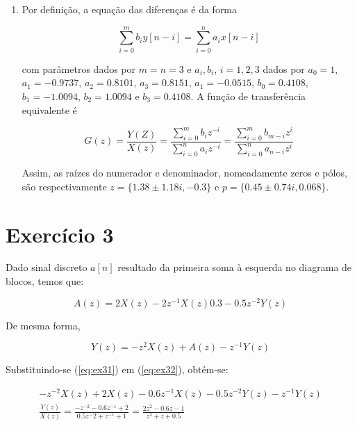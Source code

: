 \documentclass{article}
\begin{document}
\begin{enumerate}
Portanto 

\begin{equation}
    \mathcal{Z}\{n^2 e^{-a n}\} \coloneqq -z \frac{d}{dz} \mathcal{Z}\{n e^{-a n}\} & = e^{-a T_s} \frac{z^{-1}(1 + e^{-a T_s} z^{-1})}{(1 - e^{-a T_s} z^{-1})}
\end{equation}

\item %
Por definição, a equação das diferenças é da forma

\begin{equation}
\sum_{i=0}^{m} b_i y[n-i] = \sum_{i=0}^{n} a_i x[n-i]
\end{equation}

com parâmetros dados por $m = n = 3$ e $a_i, b_i$, $i = 1, 2, 3$ dados por $a_0 = 1$, $a_1 = -0.9737$, $a_2 = 0.8101$, $a_3 = 0.8151$, $a_1 = -0.0515$, $b_0 = 0.4108$, $b_1 = -1.0094$, $b_2 = 1.0094$ e $b_3 = 0.4108$. A função de transferência equivalente é

\begin{equation}
G(z) = \frac{Y(Z)}{X(z)} = \frac{\sum_{i=0}^{m} b_{i} z^{-i}}{\sum_{i=0}^{n} a_{i} z^{-i}} = \frac{\sum_{i=0}^{m} b_{m-i} z^{i}}{\sum_{i=0}^{n} a_{n-i} z^{i}}
\end{equation}

Assim, as raízes do numerador e denominador, nomeadamente zeros e pólos, são respectivamente $z = \{1.38 \pm 1.18 i, -0.3\}$ e $p = \{0.45 \pm 0.74i, 0.068\}$.

\end{enumerate}

\section*{Exercício 3}
Dado sinal discreto $a[n]$ resultado da primeira soma à esquerda no diagrama de blocos, temos que:

\begin{equation}
\label{eq:ex31}
A(z) = 2 X(z) - 2 z^{-1} X(z) 0.3 - 0.5 z^{-2} Y(z)
\end{equation}

De mesma forma,

\begin{equation}
\label{eq:ex32}
Y(z) = -z^2 X(z) + A(z) - z^{-1} Y(z)
\end{equation}

Substituindo-se (\ref{eq:ex31}) em (\ref{eq:ex32}), obtém-se:

\begin{equation}
\begin{split}
-z^{-2} X(z) + 2 X(z) - 0.6  z^{-1} X(z) - 0.5 z^{-2} Y(z) - z^{-1} Y(z) \\
\frac{Y(z)}{X(z)} = \frac{- z^{-2} - 0.6 z^{-1} + 2}{0.5 z^-2 + z^{-1} + 1} = \frac{2 z^{2} - 0.6 z - 1}{z^2 + z + 0.5}
\end{split}
\end{equation}
\end{document}
